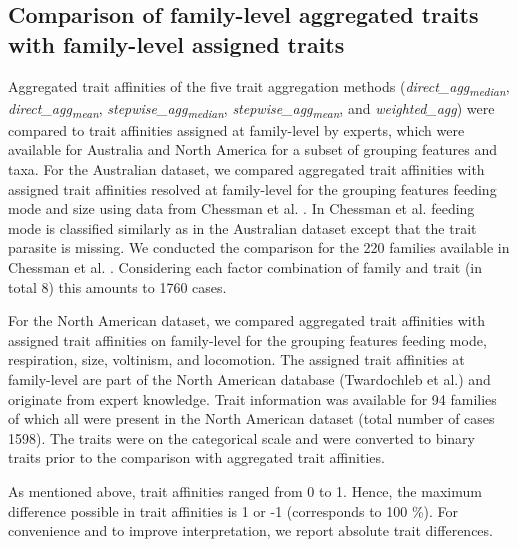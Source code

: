 \documentclass{article}
\begin{document}

\subsection*{Comparison of family-level aggregated traits with family-level assigned traits}

Aggregated trait affinities of the five trait aggregation methods (\textit{direct\_agg\textsubscript{median}}, \textit{direct\_agg\textsubscript{mean}}, \textit{stepwise\_agg\textsubscript{median}}, \textit{stepwise\_agg\textsubscript{mean}}, and \textit{weighted\_agg}) were compared to trait affinities assigned at family-level by experts, which were available for Australia and North America for a subset of grouping features and taxa. For the Australian dataset, we compared aggregated trait affinities with assigned trait affinities resolved at family-level for the grouping features feeding mode and size using data from Chessman et al. \cite{chessman_dissolved-oxygen_2018}. In Chessman et al. \cite{chessman_dissolved-oxygen_2018} feeding mode is classified similarly as in the Australian dataset except that the trait parasite is missing. We conducted the comparison for the 220 families available in Chessman et al. \cite{chessman_dissolved-oxygen_2018}. Considering each factor combination of family and trait (in total 8) this amounts to 1760 cases.

For the North American dataset, we compared aggregated trait affinities with assigned trait affinities on family-level for the grouping features feeding mode, respiration, size, voltinism, and locomotion. The assigned trait affinities at family-level are part of the North American database (Twardochleb et al.) \cite{twardochleb_trait_data_2020} and originate from expert knowledge. Trait information was available for 94 families of which all were present in the North American dataset (total number of cases 1598). The traits were on the categorical scale and were converted to binary traits prior to the comparison with aggregated trait affinities.

As mentioned above, trait affinities ranged from 0 to 1. Hence, the maximum difference possible in trait affinities is 1 or -1 (corresponds to 100 \%). For convenience and to improve interpretation, we report absolute trait differences.


\end{document}
